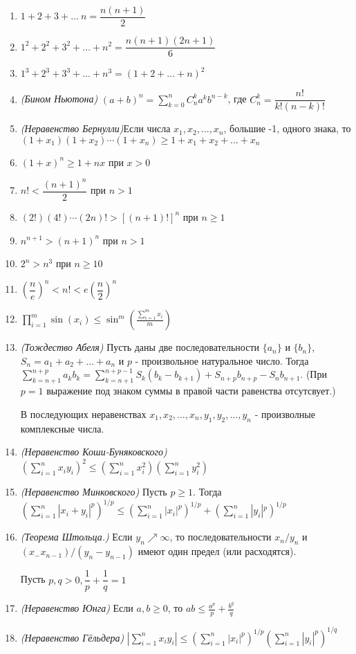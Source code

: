 \documentclass[a4paper,12pt]{scrartcl}
\begin{document}
\begin{enumerate}
\item $1+2+3+\ldots\ n = \dfrac{n(n+1)}{2}$
\item $1^2 + 2^2 + 3^2 + \ldots + n^2 = \dfrac{n(n+1)(2n+1)}{6}$
\item $1^3 + 2^3 + 3^3 +\ldots + n^3 = (1+2+\ldots +n)^2 $
\item \emph{(Бином Ньютона)} $(a+b)^n = \sum\limits_{k=0}^{n}C^{k}_{n}a^{k}b^{n-k}$, где $C_{n}^{k} = \dfrac{n!}{k!(n-k)!}$

\item \emph{(Неравенство Бернулли)}Если числа $x_1,x_2,\ldots,x_n$, большие -1,  одного знака, то $(1 + x_1)(1+x_2)\cdots(1+x_n) \geqslant 1+x_1+x_2+\ldots+x_n $
\item $(1 + x)^n \geqslant 1+nx$ при $x > 0$
\item $ n! < \dfrac{(n+1)^n}{2}$ при $n > 1$
\item $ (2!)(4!)\cdots(2n)! > [(n+1)!]^n$ при $n \geqslant 1$
\item $ n^{n+1} > (n + 1)^n$ при $n > 1$
\item $2^n > n^3$ при $n \geqslant 10$ 
\item $\left(\dfrac{n}{e}\right)^n < n! < e\left(\dfrac{n}{2}\right)^n$
\item $\prod\limits_{i=1}^{m}\sin(x_i)\leqslant \sin^m\left(\frac{\sum_{i=1}^{m}x_i}{m}\right)$
\item \emph{(Тождество Абеля)} Пусть даны две последовательности $\{a_n\}$ и $\{b_n\}$,  $S_n = a_1 + a_2 +\ldots+a_n$ и $p$ - произвольное натуральное число. Тогда $\sum\limits_{k =n+1}^{n+p}a_kb_k = \sum\limits_{k=n+1}^{n+p-1}S_k(b_k-b_{k+1}) + S_{n+p}b_{n+p} - S_nb_{n+1}$. (При $p=1$ выражение под знаком суммы в правой части равенства отсутсвует.)

В последующих неравенствах $x_1,x_2,\ldots,x_n,y_1,y_2,\ldots,y_n$ - произволные комплексные числа.

\item \emph{(Неравенство Коши-Буняковского)} $\left(\sum\limits_{i=1}^{n}x_{i}y_{i}\right)^2 \leqslant \left(\sum\limits_{i=1}^{n}x_{i}^{2}\right)\left(\sum\limits_{i=1}^{n}y_{i}^{2}\right)$
\item \emph{(Неравенство Минковского)} Пусть $p \geqslant 1$. Тогда $\left(\sum\limits_{i=1}^{n}|x_i + y_i |^p \right)^{1/p} \leqslant \left(\sum\limits_{i=1}^{n}|x_i|^p \right)^{1/p} + \left(\sum\limits_{i=1}^{n}|y_i|{^p} \right)^{1/p}  $
\item \emph{(Теорема Штольца.)} Если $y_n\nearrow\infty$, то последовательности $x_n / y_n$ и $(x_-x_{n-1})/(y_{n}-y_{n-1})$ имеют один предел (или расходятся).

Пусть $p,q > 0, \dfrac{1}{p}+\dfrac{1}{q} = 1$

\item \emph{(Неравенство Юнга)} Если $a,b \geqslant 0$, то $ab \leqslant \frac{a^p}{p} + \frac{b^q}{q}$
\item \emph{(Неравенство Гёльдера)} $\left|\sum\limits_{i=1}^{n}x_i y_i \right| \leqslant \left(\sum\limits_{i=1}^{n}|x_i|^p \right)^{1/p}  \left(\sum\limits_{i=1}^{n}|y_i|^p \right)^{1/q}  $
\end{enumerate}
\end{document}
